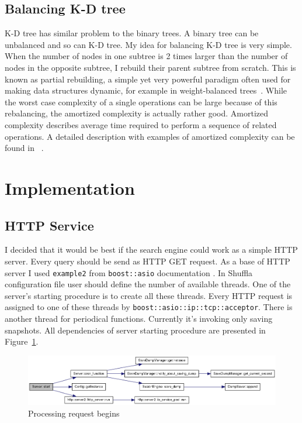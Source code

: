 \documentclass[10pt,a4paper]{article}
\begin{document}
\subsection{Balancing K-D tree}
K-D tree has similar problem to the binary trees. A binary tree can be unbalanced and so can K-D tree. My idea for balancing K-D tree is very simple. When the number of nodes in one subtree is 2 times larger than the number of nodes in the opposite subtree, I rebuild their parent subtree from scratch.
This is known as partial rebuilding, a simple yet very powerful paradigm often used for making data structures dynamic, for example in weight-balanced trees~\cite{ALPHATREES}. While the worst case complexity of a single operations can be large because of this rebalancing, the amortized complexity is actually rather good. Amortized complexity describes average time required to perform a sequence of related operations. A detailed description with examples of amortized complexity can be found in ~\cite{AMOR}.

\section{Implementation}
\label{chapter:impl}

\subsection{HTTP Service}

I decided that it would be best if the search engine could work as a simple HTTP server. Every query should be send as HTTP GET request. As a base of HTTP server I used \verb|example2| from \verb|boost::asio| documentation \cite{ASIOHTTP}. In Shuffla configuration file user should define the number of available threads. One of the server's starting procedure is to create all these threads. Every HTTP request is assigned to one of these threads by \verb|boost::asio::ip::tcp::acceptor|. There is another thread for periodical functions. Currently it's invoking only saving snapshots. All dependencies of server starting procedure are presented in Figure~\ref{fig:httpservice}.

\begin{figure}[h!]
\centering
  \includegraphics[width=16cm]{start}
  \caption{Processing request begins}
  \label{fig:httpservice}
\end{figure}
\end{document}
